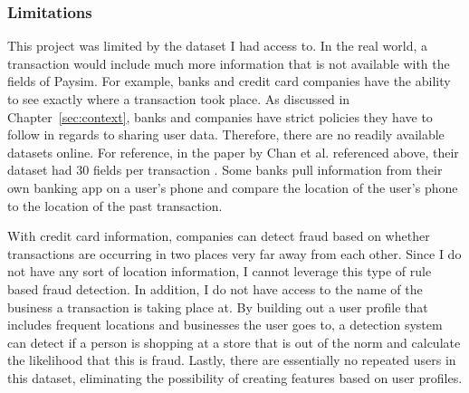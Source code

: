 \documentclass[midd]{thesis}
\begin{document}
\subsubsection{Limitations}

This project was limited by the dataset I had access to. In the real world, a transaction would include much more information that is not available with the fields of Paysim. For example, banks and credit card companies have the ability to see exactly where a transaction took place. As discussed in Chapter~\ref{sec:context}, banks and companies have strict policies they have to follow in regards to sharing user data. Therefore, there are no readily available datasets online. For reference, in the paper by Chan et al. referenced above, their dataset had 30 fields per transaction \cite{Chan}. Some banks pull information from their own banking app on a user's phone and compare the location of the user's phone to the location of the past transaction. 

With credit card information, companies can detect fraud based on whether transactions are occurring in two places very far away from each other. Since I do not have any sort of location information, I cannot leverage this type of rule based fraud detection. In addition, I do not have access to the name of the business a transaction is taking place at. By building out a user profile that includes frequent locations and businesses the user goes to, a detection system can detect if a person is shopping at a store that is out of the norm and calculate the likelihood that this is fraud. Lastly, there are essentially no repeated users in this dataset, eliminating the possibility of creating features based on user profiles.
\end{document}
